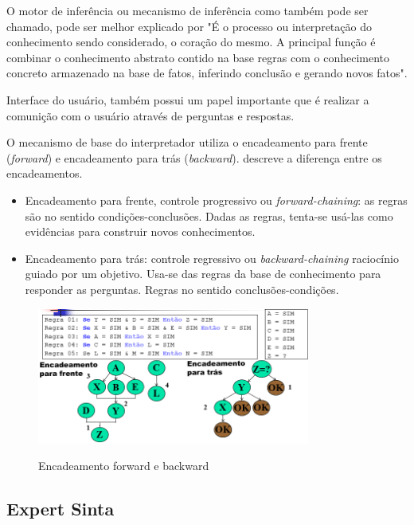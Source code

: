 O motor de inferência ou mecanismo de inferência como também pode ser chamado, pode ser melhor explicado por
\cite{antoniopereira} "É o processo ou interpretação do conhecimento sendo considerado, o coração do mesmo. A principal função é combinar o conhecimento abstrato contido na base regras com o conhecimento concreto armazenado na base de fatos, inferindo conclusão e gerando novos fatos".

Interface do usuário, também possui um papel importante que é realizar a comunição com o usuário através de perguntas e respostas.

O mecanismo de base do interpretador utiliza o encadeamento para frente (\textit{forward}) e encadeamento para trás (\textit{backward}).  descreve a diferença entre os encadeamentos.

\begin{itemize}
    \item Encadeamento para frente, controle progressivo ou \textit{forward-chaining}: as regras são no sentido condições-conclusões. Dadas as regras, tenta-se usá-las como evidências para construir novos conhecimentos.
    \item Encadeamento para trás: controle regressivo ou \textit{backward-chaining} raciocínio guiado por um
objetivo. Usa-se das regras da base de conhecimento para responder as perguntas. Regras no sentido conclusões-condições.
\end{itemize}

\begin{figure}[H]
    \centering
    \caption{Encadeamento forward e backward}
    \includegraphics[width=0.8\textwidth]{encadeamento.PNG}
    \label{encadeamento}
\end{figure}


\subsection{Expert Sinta}
\label{expertsinta}

